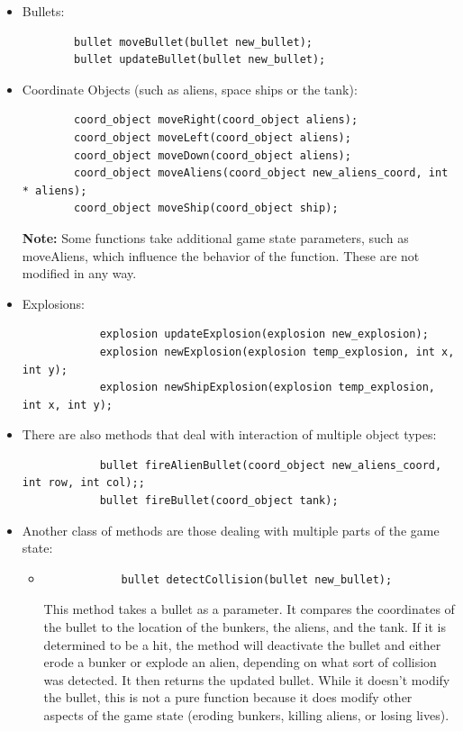 \documentclass[11pt,letter,oneside]{report}
\begin{document}
\begin{itemize}
	\item Bullets:
		\begin{verbatim}
		bullet moveBullet(bullet new_bullet);
		bullet updateBullet(bullet new_bullet);
		\end{verbatim}
	\item	Coordinate Objects (such as aliens, space ships or the tank):
		\begin{verbatim}
		coord_object moveRight(coord_object aliens);
		coord_object moveLeft(coord_object aliens);
		coord_object moveDown(coord_object aliens);
		coord_object moveAliens(coord_object new_aliens_coord, int * aliens);
		coord_object moveShip(coord_object ship);
		\end{verbatim}
		\textbf{Note:}  Some functions take additional game state parameters, such as moveAliens, which influence the behavior of the function.  These are not modified in any way.
	\item Explosions:
		\begin{verbatim}
			explosion updateExplosion(explosion new_explosion);
			explosion newExplosion(explosion temp_explosion, int x, int y);
			explosion newShipExplosion(explosion temp_explosion, int x, int y);
		\end{verbatim}
	\item There are also methods that deal with interaction of multiple object types:
		\begin{verbatim}
			bullet fireAlienBullet(coord_object new_aliens_coord, int row, int col);;
			bullet fireBullet(coord_object tank);
		\end{verbatim}
	\item Another class of methods are those dealing with multiple parts of the game state:
		\begin{itemize}
			\item
			\begin{verbatim}
			bullet detectCollision(bullet new_bullet);
			\end{verbatim}

			  This method takes a bullet as a parameter.  It compares the coordinates of the bullet to the location of the bunkers, the aliens, and the tank.  If it is determined to be a hit, the method will deactivate the bullet and either erode a bunker or explode an alien, depending on what sort of collision was detected.  It then returns the updated bullet.  While it doesn't modify the bullet, this is not a pure function because it does modify other aspects of the game state (eroding bunkers, killing aliens, or losing lives).
		\end{itemize}
\end{itemize}
\end{document}
